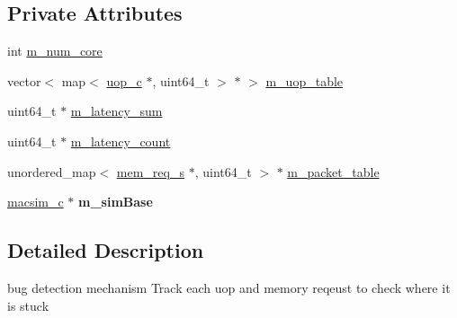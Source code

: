 \subsection*{Private Attributes}
\begin{DoxyCompactItemize}
\item 
int \hyperlink{classbug__detector__c_a3d90d9bf03b550875f24acc533352640}{m\_\-num\_\-core}
\item 
vector$<$ map$<$ \hyperlink{classuop__c}{uop\_\-c} $\ast$, uint64\_\-t $>$ $\ast$ $>$ \hyperlink{classbug__detector__c_a0b23d445e54499579a1126223c119948}{m\_\-uop\_\-table}
\item 
uint64\_\-t $\ast$ \hyperlink{classbug__detector__c_ae1a942538a13d23d8bee7355c7e22e0c}{m\_\-latency\_\-sum}
\item 
uint64\_\-t $\ast$ \hyperlink{classbug__detector__c_a40b39407ec6f0e2e0888cac9a7486453}{m\_\-latency\_\-count}
\item 
unordered\_\-map$<$ \hyperlink{structmem__req__s}{mem\_\-req\_\-s} $\ast$, uint64\_\-t $>$ $\ast$ \hyperlink{classbug__detector__c_a650c89720f96ea9c79230e7341b88885}{m\_\-packet\_\-table}
\item 
\hypertarget{classbug__detector__c_a305a1bee1bec006e7dcbc7fb0645f693}{
\hyperlink{classmacsim__c}{macsim\_\-c} $\ast$ {\bfseries m\_\-simBase}}
\label{classbug__detector__c_a305a1bee1bec006e7dcbc7fb0645f693}

\end{DoxyCompactItemize}


\subsection{Detailed Description}
bug detection mechanism Track each uop and memory reqeust to check where it is stuck 

